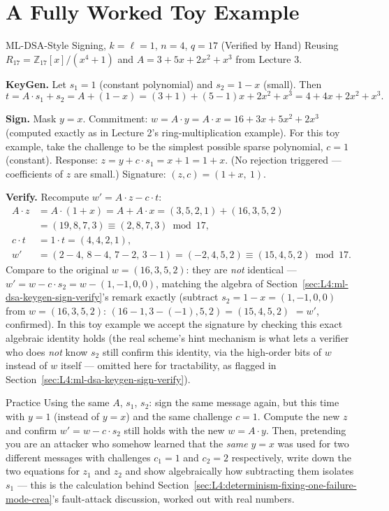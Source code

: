 \section{A Fully Worked Toy Example}
\label{sec:L4:a-fully-worked-toy-example}

\begin{exbox}{ML-DSA-Style Signing, $k=\ell=1$, $n=4$, $q=17$ (Verified by Hand)}
Reusing $R_{17}=\mathbb{Z}_{17}[x]/(x^4+1)$ and $A = 3+5x+2x^2+x^3$ from Lecture 3.

\textbf{KeyGen.} Let $s_1 = 1$ (constant polynomial) and $s_2 = 1-x$ (small). Then
$$
t = A\cdot s_1 + s_2 = A + (1-x) = (3+1) + (5-1)x+2x^2+x^3 = 4+4x+2x^2+x^3.
$$

\textbf{Sign.} Mask $y = x$. Commitment: $w = A\cdot y = A\cdot x = 16+3x+5x^2+2x^3$ (computed exactly as in Lecture 2's ring-multiplication example). For this toy example, take the challenge to be the simplest possible sparse polynomial, $c=1$ (constant). Response: $z = y + c\cdot s_1 = x + 1 = 1+x$. (No rejection triggered --- coefficients of $z$ are small.) Signature: $(z,c) = (1+x,\ 1)$.

\textbf{Verify.} Recompute $w' = A\cdot z - c\cdot t$:
\begin{align*}
A\cdot z &= A\cdot(1+x) = A + A\cdot x = (3,5,2,1) + (16,3,5,2) \\
&= (19,8,7,3) \equiv (2,8,7,3) \bmod 17, \\
c\cdot t &= 1\cdot t = (4,4,2,1), \\
w' &= (2-4,\,8-4,\,7-2,\,3-1) = (-2,4,5,2) \equiv (15,4,5,2) \bmod 17.
\end{align*}
Compare to the original $w = (16,3,5,2)$: they are \emph{not} identical --- $w' = w - c\cdot s_2 = w - (1,-1,0,0)$, matching the algebra of Section~\ref{sec:L4:ml-dsa-keygen-sign-verify}'s remark exactly (subtract $s_2=1-x=(1,-1,0,0)$ from $w=(16,3,5,2)$: $(16-1,3-(-1),5,2)=(15,4,5,2)$ $=w'$, confirmed). In this toy example we accept the signature by checking this exact algebraic identity holds (the real scheme's hint mechanism is what lets a verifier who does \emph{not} know $s_2$ still confirm this identity, via the high-order bits of $w$ instead of $w$ itself --- omitted here for tractability, as flagged in Section~\ref{sec:L4:ml-dsa-keygen-sign-verify}).
\end{exbox}

\begin{exercisebox}{Practice}
Using the same $A$, $s_1$, $s_2$: sign the same message again, but this time with $y = 1$ (instead of $y=x$) and the same challenge $c=1$. Compute the new $z$ and confirm $w' = w - c\cdot s_2$ still holds with the new $w = A\cdot y$. Then, pretending you are an attacker who somehow learned that the \emph{same} $y=x$ was used for two different messages with challenges $c_1=1$ and $c_2=2$ respectively, write down the two equations for $z_1$ and $z_2$ and show algebraically how subtracting them isolates $s_1$ --- this is the calculation behind Section~\ref{sec:L4:determinism-fixing-one-failure-mode-crea}'s fault-attack discussion, worked out with real numbers.
\end{exercisebox}

